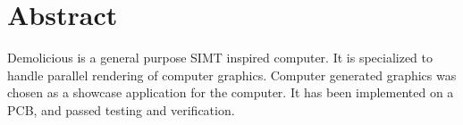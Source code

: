 \documentclass[../main/report.tex]{subfiles}
\begin{document}
\chapter*{Abstract}
\label{sec:abstract}

\vspace*{\fill}

Demolicious is a general purpose SIMT inspired computer.
It is specialized to handle parallel rendering of computer graphics.
Computer generated graphics was chosen as a showcase application for the computer.
It has been implemented on a PCB, and passed testing and verification.

\vspace*{\fill}
\end{document}
